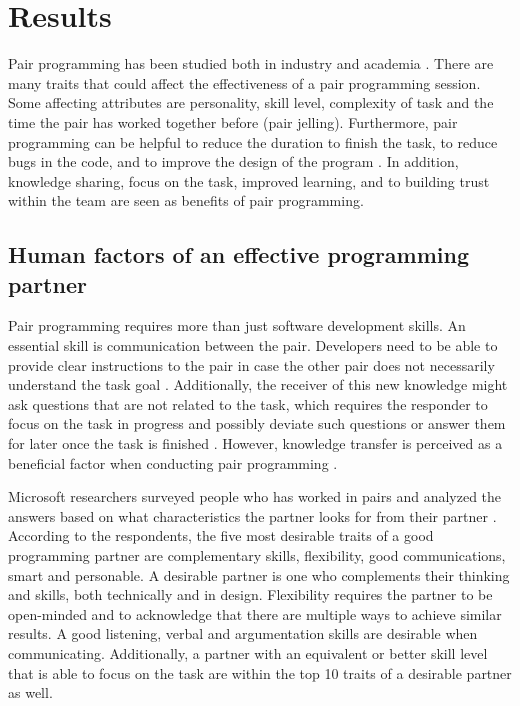 \documentclass[conference]{IEEEtran}
\begin{document}
\section{Results}

Pair programming has been studied both in industry and academia \cite{Williams2000Strengthening, 10.1145/1414004.1414026, Hannay2009effectiveness}. There are many traits that could affect the effectiveness of a pair programming session. Some affecting attributes are personality, skill level, complexity of task and the time the pair has worked together before (pair jelling). Furthermore, pair programming can be helpful to reduce the duration to finish the task, to reduce bugs in the code, and to improve the design of the program \cite{10.1145/2652524.2652529}. In addition, knowledge sharing, focus on the task, improved learning, and to building trust within the team are seen as benefits of pair programming.

\subsection{Human factors of an effective programming partner}

Pair programming requires more than just software development skills. An essential skill is communication between the pair. Developers need to be able to provide clear instructions to the pair in case the other pair does not necessarily understand the task goal \cite{10.1145/2652524.2652529}. Additionally, the receiver of this new knowledge might ask questions that are not related to the task, which requires the responder to focus on the task in progress and possibly deviate such questions or answer them for later once the task is finished \cite{10.1145/2652524.2652529}. However, knowledge transfer is perceived as a beneficial factor when conducting pair programming \cite{10.1145/2652524.2652529}.

Microsoft researchers surveyed people who has worked in pairs and analyzed the answers based on what characteristics the partner looks for from their partner \cite{10.1145/1414004.1414026}. According to the respondents, the five most desirable traits of a good programming partner are complementary skills, flexibility, good communications, smart and personable. A desirable partner is one who complements their thinking and skills, both technically and in design. Flexibility requires the partner to be open-minded and to acknowledge that there are multiple ways to achieve similar results. A good listening, verbal and argumentation skills are desirable when communicating. Additionally, a partner with an equivalent or better skill level that is able to focus on the task are within the top 10 traits of a desirable partner as well.
\end{document}

